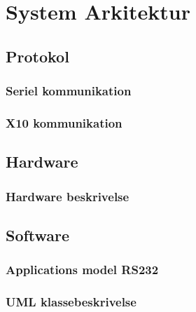 \chapter{System Arkitektur}

\section{Protokol}

\subsection{Seriel kommunikation}


\subsection{X10 kommunikation}
%

\newpage
\section{Hardware}

\subsection{Hardware beskrivelse}


\newpage
\section{Software}
\subsection{Applications model RS232}

\clearpage
\subsection{UML klassebeskrivelse}
